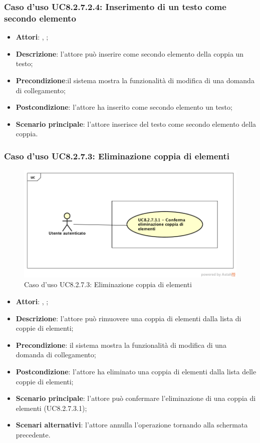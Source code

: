 		\subsubsection{Caso d'uso UC8.2.7.2.4: Inserimento di un testo come secondo elemento}
		\label{UC8.2.7.2.4}
		\begin{itemize}
			\item \textbf{Attori}: \uau, \uaupro;
			\item \textbf{Descrizione}: l'attore può inserire come secondo elemento della coppia un testo;
			\item \textbf{Precondizione}:il sistema mostra la funzionalità di modifica di una domanda di collegamento; 
			\item \textbf{Postcondizione}: l'attore ha inserito come secondo elemento un testo;
			\item \textbf{Scenario principale}: l'attore inserisce del testo come secondo elemento della coppia.
		\end{itemize}
	
	\subsubsection{Caso d'uso UC8.2.7.3: Eliminazione coppia di elementi}
	\label{UC8.2.7.3}
	\begin{figure}[h]
		\centering
		\includegraphics[scale=0.5,keepaspectratio]{UML/UC8_2_7_3.png}
		\caption{Caso d'uso UC8.2.7.3: Eliminazione coppia di elementi}
	\end{figure}
	\FloatBarrier
	\begin{itemize}
		\item \textbf{Attori}: \uau, \uaupro;
		\item \textbf{Descrizione}: l'attore può rimuovere una coppia di elementi dalla lista di coppie di elementi;
		\item \textbf{Precondizione}: il sistema mostra la funzionalità di modifica di una domanda di collegamento; 
		\item \textbf{Postcondizione}: l'attore ha eliminato una coppia di elementi dalla lista delle coppie di elementi;
		\item \textbf{Scenario principale}: l'attore può confermare l'eliminazione di una coppia di elementi (UC8.2.7.3.1);
		\item \textbf{Scenari alternativi}: l'attore annulla l'operazione tornando alla schermata precedente.
	\end{itemize}


